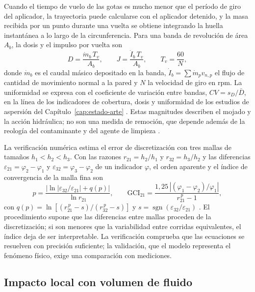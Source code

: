 Cuando el tiempo de vuelo de las gotas es mucho menor que el período de giro del aplicador, la trayectoria puede calcularse con el aplicador detenido, y la masa recibida por un punto durante una vuelta se obtiene integrando la huella instantánea a lo largo de la circunferencia. Para una banda de revolución de área $A_b$, la dosis y el impulso por vuelta son
\begin{equation}
  D=\frac{\dot m_b\,T_v}{A_b},\qquad J=\frac{\dot I_b\,T_v}{A_b},\qquad
  T_v=\frac{60}{N},
  \label{eq:teo-dosis}
\end{equation}
donde $\dot m_b$ es el caudal másico depositado en la banda, $\dot I_b=\sum\dot m_pv_{n,p}$ el flujo de cantidad de movimiento normal a la pared y $N$ la velocidad de giro en rpm. La uniformidad se expresa con el coeficiente de variación entre bandas, $CV=s_D/\bar D$, en la línea de los indicadores de cobertura, dosis y uniformidad de los estudios de aspersión del Capítulo~\ref{cap:estado-arte} \cite{fei2026,fang2023}. Estas magnitudes describen el mojado y la acción hidráulica; no son una medida de remoción, que depende además de la reología del contaminante y del agente de limpieza \cite{chalk1994}.

La verificación numérica estima el error de discretización con tres mallas de tamaños $h_1<h_2<h_3$. Con las razones $r_{21}=h_2/h_1$ y $r_{32}=h_3/h_2$ y las diferencias $\varepsilon_{21}=\varphi_2-\varphi_1$ y $\varepsilon_{32}=\varphi_3-\varphi_2$ de un indicador $\varphi$, el orden aparente y el índice de convergencia de la malla fina son
\begin{equation}
  p=\frac{\left|\ln\left|\varepsilon_{32}/\varepsilon_{21}\right|+q(p)\right|}{\ln r_{21}},\qquad
  \mathrm{GCI}_{21}=\frac{1{,}25\,\left|(\varphi_1-\varphi_2)/\varphi_1\right|}{r_{21}^{\,p}-1},
  \label{eq:teo-gci}
\end{equation}
con $q(p)=\ln\left[(r_{21}^{\,p}-s)/(r_{32}^{\,p}-s)\right]$ y $s=\operatorname{sgn}(\varepsilon_{32}/\varepsilon_{21})$ \cite{celik2008}. El procedimiento supone que las diferencias entre mallas proceden de la discretización; si son menores que la variabilidad entre corridas equivalentes, el índice deja de ser interpretable. La verificación comprueba que las ecuaciones se resuelven con precisión suficiente; la validación, que el modelo representa el fenómeno físico, exige una comparación con mediciones.

\subsection{Impacto local con volumen de fluido}
\label{sec:teo-vof}

